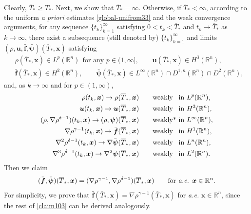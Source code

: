 \documentclass[11pt,reqno]{amsart}
\numberwithin{rk}{section}
\numberwithin{prop}{section}
\numberwithin{mydef}{section}
\numberwithin{lem}{section}
\numberwithin{equation}{section}
\numberwithin{thm}{section}
\begin{document}
Clearly, $\overline{T}_*\ge T_*$.  Next, we show  that $\overline{T}_*=\infty$. Otherwise, if $\overline{T}_*<\infty$, 
according to  the uniform {\it a priori} estimates \eqref{global-unifrom33} and the weak convergence arguments, for any sequence $\{t_k\}_{k=1}^\infty$ satisfying $0<t_k<\overline{T}_*$ and $t_k\to \overline{T}_*$ as $k\to \infty$, there exist a subsequence (still denoted by) $\{t_{k}\}_{k=1}^\infty$ and limits $(\rho,\boldsymbol{u}, \bar{\boldsymbol{f}}, \bar{\boldsymbol{\psi}})(\overline{T}_*,\boldsymbol{x})$ satisfying 
\begin{align*}
&\rho(\overline{T}_*,\boldsymbol{x})\in L^p(\mathbb{R}^n) \ \ \text{for any $p\in (1,\infty]$},\qquad
\boldsymbol{u}(\overline{T}_*,\boldsymbol{x})\in H^3(\mathbb{R}^n),\\
&\bar{\boldsymbol{f}}(\overline{T}_*,\boldsymbol{x})\in H^2(\mathbb{R}^n),\qquad \bar{\boldsymbol{\psi}}(\overline{T}_*,\boldsymbol{x})\in L^\infty(\mathbb{R}^n)\cap D^{1,n}(\mathbb{R}^n)\cap D^{2}(\mathbb{R}^n), 
\end{align*}
and, as $k\to\infty$ and for $p\in (1,\infty)$,
\begin{equation}\label{f2}
\begin{aligned}
\rho(t_k,\boldsymbol{x})\to \rho(\overline{T}_*,\boldsymbol{x}) \qquad &\text{weakly\  \, in } L^p(\mathbb{R}^n),\\
\boldsymbol{u}(t_{k},\boldsymbol{x})\to  \boldsymbol{u}(\overline{T}_*,\boldsymbol{x}) \qquad &\text{weakly\  \,  in } H^3(\mathbb{R}^n),\\
(\rho,\nabla\rho^{\delta-1})(t_{k},\boldsymbol{x})\to  (\rho,\bar{\boldsymbol{\psi}})(\overline{T}_*,\boldsymbol{x}) \qquad &\text{weakly* in } L^\infty(\mathbb{R}^n),\\
\nabla\rho^{\gamma-1}(t_k,\boldsymbol{x})\to \bar{\boldsymbol{f}}(\overline{T}_*,\boldsymbol{x}) \qquad &\text{weakly  \, in } H^1(\mathbb{R}^n),\\ 
\nabla^2\rho^{\delta-1}(t_{k},\boldsymbol{x})\to  \nabla\bar{\boldsymbol{\psi}}(\overline{T}_*,\boldsymbol{x}) \qquad &\text{weakly  \, in } L^{n}(\mathbb{R}^n),\\
\nabla^3\rho^{\delta-1}(t_{k},\boldsymbol{x})\to  \nabla^2\bar{\boldsymbol{\psi}}(\overline{T}_*,\boldsymbol{x}) \qquad &\text{weakly  \, in } L^{2}(\mathbb{R}^n).
\end{aligned}
\end{equation}
Then we claim 
\begin{equation}\label{claim103}
(\bar{\boldsymbol{f}},\bar{\boldsymbol{\psi}})(\overline{T}_*,\boldsymbol{x})=(\nabla\rho^{\gamma-1},\nabla \rho^{\delta-1})(\overline{T}_*,\boldsymbol{x})
\qquad\text{for {\it a.e.} $\boldsymbol{x}\in \mathbb{R}^n$}.
\end{equation}
 For simplicity, we prove that $\bar{\boldsymbol{f}}(\overline{T}_*,\boldsymbol{x})=\nabla\rho^{\gamma-1}(\overline{T}_*,\boldsymbol{x})$ for {\it a.e.} $\boldsymbol{x}\in \mathbb{R}^n$, since the rest of \eqref{claim103} can be derived analogously. 
\end{document}
